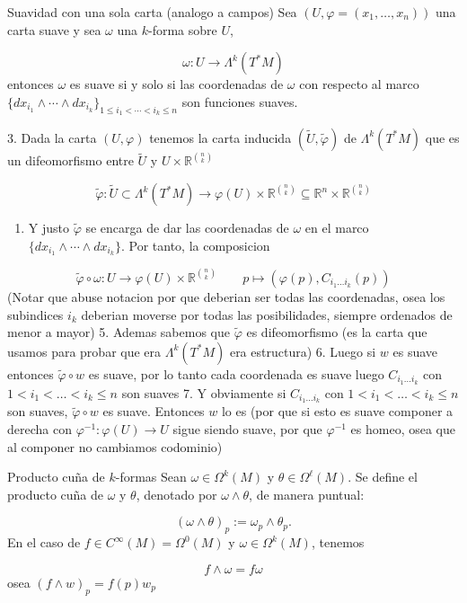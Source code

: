 \begin{bookproposition}{Suavidad con una sola carta (analogo a campos)}
Sea $(U,\varphi=(x_1,\ldots,x_n))$ una carta suave y sea $\omega$ una $k$-forma sobre $U$,

\[
\omega:U\to\Lambda^k(T^*M)
\]
entonces $\omega$ es suave si y solo si las coordenadas de $\omega$ con respecto al marco $\{dx_{i_1}\wedge\cdots\wedge dx_{i_k}\}_{1\le i_1<\cdots<i_k\le n}$ son funciones suaves.

\end{bookproposition}
\begin{bookproof}{}
3. Dada la carta $(U,\varphi)$ tenemos la carta inducida $(\widetilde U,\widetilde\varphi)$ de $\Lambda^k(T^*M)$ que es un difeomorfismo entre $\widetilde U$ y $U\times\mathbb R^{\binom nk}$

\[
\widetilde\varphi:\widetilde U\subset\Lambda^k(T^*M)\to \varphi(U)\times\mathbb R^{\binom nk}\subseteq \mathbb{R}^{n} \times\mathbb R^{\binom nk}
\]
\begin{enumerate}[start=4]
\item Y justo $\widetilde\varphi$ se encarga de dar las coordenadas de $\omega$ en el marco $\{dx_{i_1}\wedge\cdots\wedge dx_{i_k}\}$. Por tanto, la composicion
\end{enumerate}
\[
\widetilde\varphi\circ\omega: U\rightarrow \varphi(U)\times\mathbb R^{\binom nk}\qquad p\mapsto(\varphi(p),C_{i_{1}\ldots i_{k}}(p))
\]
(Notar que abuse notacion por que deberian ser todas las coordenadas, osea los subindices $i_{k}$ deberian moverse por todas las posibilidades, siempre ordenados de menor a mayor) 5. Ademas sabemos que $\widetilde{\varphi}$ es difeomorfismo (es la carta que usamos para probar que era $\Lambda^{k}( T^{*}M)$ era estructura) 6. Luego si $w$ es suave entonces $\widetilde{\varphi}\circ w$ es suave, por lo tanto cada coordenada es suave luego $C_{i_{1}\ldots i_{k}}$ con $1<i_{1}<\ldots<i_{k}\leq n$ son suaves 7. Y obviamente si $C_{i_{1}\ldots i_{k}}$ con $1<i_{1}<\ldots<i_{k}\leq n$ son suaves, $\widetilde{\varphi}\circ w$ es suave. Entonces $w$ lo es (por que si esto es suave componer a derecha con $\varphi ^{-1}:\varphi(U)\rightarrow U$ sigue siendo suave, por que $\varphi ^{-1}$ es homeo, osea que al componer no cambiamos codominio)

\bookqed
\end{bookproof}
\begin{bookdefinition}{Producto cuña de $k$-formas}
Sean $\omega\in\Omega^k(M)$ y $\theta\in\Omega^\ell(M)$. Se define el producto cuña de $\omega$ y $\theta$, denotado por $\omega\wedge\theta$, de manera puntual:

\[
(\omega\wedge\theta)_p:=\omega_p\wedge\theta_p.
\]
En el caso de $f\in C^\infty(M)=\Omega^0(M)$ y $\omega\in\Omega^k(M)$, tenemos

\[
f\wedge\omega=f\omega
\]
osea $(f\wedge w)_{p}=f(p)w_{p}$

\end{bookdefinition}
